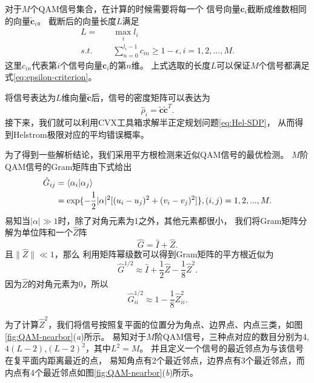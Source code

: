 对于$M$个QAM信号集合，在计算的时候需要将每一个
信号向量$\bm{c}_i$截断成维数相同的向量$\tilde{\bm{c}}_i$。
截断后的向量长度$L$满足
\begin{equation}
\begin{split}
L = \quad  & \max_i l_i  \\
s.t. \quad &\sum_{n=0}^{l_i-1} c_{in} \ge 1 - \epsilon, i=1,2,...,M.
\end{split}
\end{equation}
这里$c_{in}$代表第$i$个信号向量$\bm{c}_i$的第$n$维。
上式选取的长度$L$可以保证$M$个信号都满足式\ref{eq:epsilon-criterion}。

将信号表达为$L$维向量$\tilde{\bm{c}}$后，信号的密度矩阵可以表达为
\begin{equation}
\hat{\rho}_i = \tilde{\bm{c}} \tilde{\bm{c}}^T.
\end{equation}
接下来，我们就可以利用CVX工具箱\cite{cvx,gb08}求解半正定规划问题\ref{eq:Hel-SDP}，
从而得到Helstrom极限对应的平均错误概率。

为了得到一些解析结论，我们采用平方根检测来近似QAM信号的最优检测。
$M$阶QAM信号的Gram矩阵由下式给出
\begin{equation}
\begin{split}
\hat{G}_{ij} &= \bra{\alpha_i}\ket{\alpha_j} \\
 &= \exp\{-\frac{1}{2} |\alpha|^2 [(u_i-u_j)^2 + (v_i-v_j)^2]\}, (i,j)=1,2,...,M.
\end{split}
\end{equation}
易知当$|\alpha|\gg1$时，除了对角元素为1之外，其他元素都很小，
我们将Gram矩阵分解为单位阵和一个$\hat{Z}$阵
\begin{equation}
\hat{G} = \hat{I} + \hat{Z}.
\end{equation}
且$\parallel \hat{Z}  \parallel \ll 1$，那么
利用矩阵幂级数可以得到Gram矩阵的平方根近似为
\begin{equation}
\hat{G}^{1/2} \approx \hat{I} + \frac{1}{2} \hat{Z} - \frac{1}{8} \hat{Z}^2.
\end{equation}
因为$\hat{Z}$的对角元素为0，所以
\begin{equation}
\hat{G}^{1/2}_{ii} \approx 1 - \frac{1}{8} \hat{Z}^2_{ii}.
\end{equation}

为了计算$\hat{Z}^2$，我们将信号按照复平面的位置分为角点、边界点、内点三类，如图\ref{fig:QAM-nearbor}(\textit{a})所示。
易知对于$M$阶QAM信号，三种点对应的数目分别为4,$4(L-2)$,$(L-2)^2$，其中$L^2=M$。
并且定义一个信号的最近邻点为与该信号在复平面内距离最近的点，
易知角点有2个最近邻点，边界点有3个最近邻点，而内点有4个最近邻点如图\ref{fig:QAM-nearbor}(\textit{b})所示。


